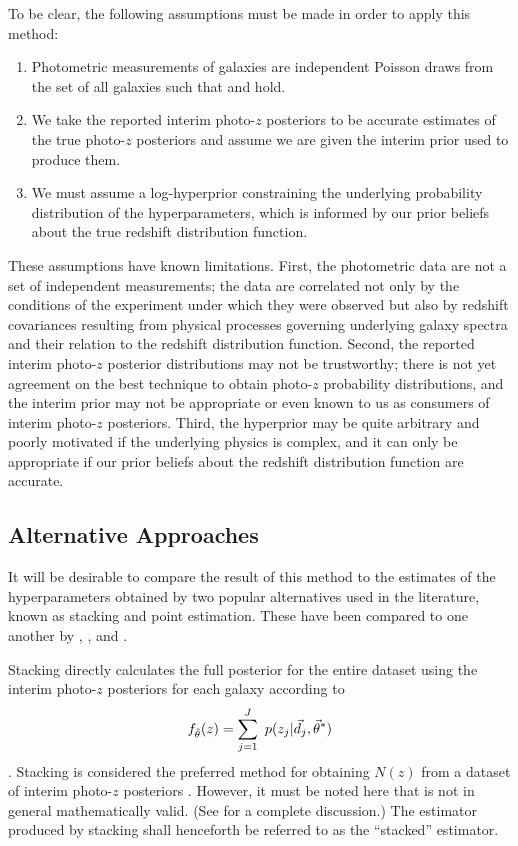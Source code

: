 To be clear, the following assumptions must be made in order to apply this method:

\begin{enumerate}
	\item Photometric measurements of galaxies are independent Poisson draws from the set of all galaxies such that  and  hold.
	\item We take the reported interim photo-$z$ posteriors to be accurate estimates of the true photo-$z$ posteriors and assume we are given the interim prior used to produce them.
	\item We must assume a log-hyperprior constraining the underlying probability distribution of the hyperparameters, which is informed by our prior beliefs about the true redshift distribution function.
\end{enumerate}

These assumptions have known limitations.  
First, the photometric data are not a set of independent measurements; the data are correlated not only by the conditions of the experiment under which they were observed but also by redshift covariances resulting from physical processes governing underlying galaxy spectra and their relation to the redshift distribution function.  
Second, the reported interim photo-$z$ posterior distributions may not be trustworthy; there is not yet agreement on the best technique to obtain photo-$z$ probability distributions, and the interim prior may not be appropriate or even known to us as consumers of interim photo-$z$ posteriors.  
Third, the hyperprior may be quite arbitrary and poorly motivated if the underlying physics is complex, and it can only be appropriate if our prior beliefs about the redshift distribution function are accurate.

\subsection{Alternative Approaches}

It will be desirable to compare the result of this method to the estimates of the hyperparameters obtained by two popular alternatives used in the literature, known as stacking and point estimation.   
These have been compared 
to one another by \citet{Hildebrandt2012}, \citet{Benjamin2013}, and \citet{Asorey2016}.

Stacking directly calculates the full posterior for the entire dataset using the interim photo-$z$ posteriors for each galaxy according to 
\begin{equation}
\eqlabel{eq:stack}
f_{\hat{\theta}}(z) = \sum_{j=1}^{J}\ p(z_{j}|\vec{d}_{j},\vec{\theta}^{*})
\end{equation}
\citep{Lima2008}.  
Stacking is considered the preferred method for obtaining $N(z)$ from a dataset of interim photo-$z$ posteriors \citep{Sheldon2012, Kelly2014, Benjamin2013, Bonnett2015a, Viironen2015, Asorey2016}.  
However, it must be noted here that  is not in general mathematically valid.  
(See \citet{Hogg2012} for a complete discussion.)  
The estimator produced by stacking shall henceforth be referred to as the ``stacked'' estimator.


